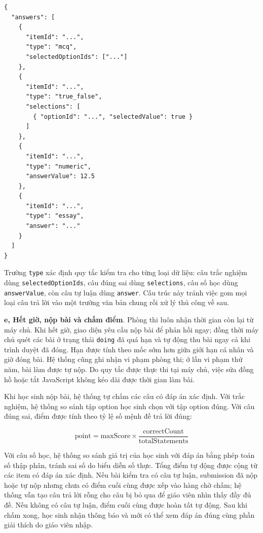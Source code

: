 \documentclass[../DoAn.tex]{subfiles}
\begin{document}
\begin{verbatim}
{
  "answers": [
    {
      "itemId": "...",
      "type": "mcq",
      "selectedOptionIds": ["..."]
    },
    {
      "itemId": "...",
      "type": "true_false",
      "selections": [
        { "optionId": "...", "selectedValue": true }
      ]
    },
    {
      "itemId": "...",
      "type": "numeric",
      "answerValue": 12.5
    },
    {
      "itemId": "...",
      "type": "essay",
      "answer": "..."
    }
  ]
}
\end{verbatim}

Trường \texttt{type} xác định quy tắc kiểm tra cho từng loại dữ liệu: câu trắc nghiệm dùng \texttt{selectedOptionIds}, câu đúng sai dùng \texttt{selections}, câu số học dùng \texttt{answerValue}, còn câu tự luận dùng \texttt{answer}. Cấu trúc này tránh việc gom mọi loại câu trả lời vào một trường văn bản chung rồi xử lý thủ công về sau.

\textbf{e, Hết giờ, nộp bài và chấm điểm}. Phòng thi luôn nhận thời gian còn lại từ máy chủ. Khi hết giờ, giao diện yêu cầu nộp bài để phản hồi ngay; đồng thời máy chủ quét các bài ở trạng thái \texttt{doing} đã quá hạn và tự động thu bài ngay cả khi trình duyệt đã đóng. Hạn được tính theo mốc sớm hơn giữa giới hạn cá nhân và giờ đóng bài. Hệ thống cũng ghi nhận vi phạm phòng thi; ở lần vi phạm thứ năm, bài làm được tự nộp. Do quy tắc được thực thi tại máy chủ, việc sửa đồng hồ hoặc tắt JavaScript không kéo dài được thời gian làm bài.

Khi học sinh nộp bài, hệ thống tự chấm các câu có đáp án xác định. Với trắc nghiệm, hệ thống so sánh tập option học sinh chọn với tập option đúng. Với câu đúng sai, điểm được tính theo tỷ lệ số mệnh đề trả lời đúng:

\begin{equation}
\mathrm{point} = \mathrm{maxScore} \times \frac{\mathrm{correctCount}}{\mathrm{totalStatements}}
\end{equation}

Với câu số học, hệ thống so sánh giá trị của học sinh với đáp án bằng phép toán số thập phân, tránh sai số do biểu diễn số thực. Tổng điểm tự động được cộng từ các item có đáp án xác định. Nếu bài kiểm tra có câu tự luận, submission đã nộp hoặc tự nộp nhưng chưa có điểm cuối cùng được xếp vào hàng chờ chấm; hệ thống vẫn tạo câu trả lời rỗng cho câu bị bỏ qua để giáo viên nhìn thấy đầy đủ đề. Nếu không có câu tự luận, điểm cuối cùng được hoàn tất tự động. Sau khi chấm xong, học sinh nhận thông báo và mới có thể xem đáp án đúng cùng phần giải thích do giáo viên nhập.
\end{document}
